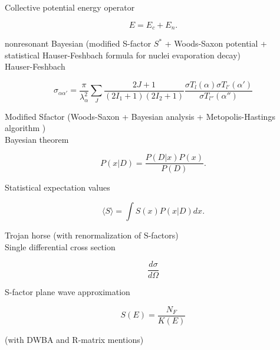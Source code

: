\documentclass[openany]{book}
\begin{document}
Collective potential energy operator

\begin{equation}\label{eq:middleFusion_collectivePotential}
	E = E_c + E_n.
\end{equation}


nonresonant Bayesian (modified S-factor $S^{*}$ + Woods-Saxon potential + statistical Hauser-Feshbach formula for nuclei evaporation decay)\cite{li_fang_bucher_li_ru_tang_2020} \\

Hauser-Feshbach 

\begin{equation}\label{eq:middleFusion_hauserFeschbach}
	\sigma_{\alpha \alpha'} = \frac{\pi}{\lambda^2_\alpha} \sum_{J} \frac{2J+1}{(2I_1 + 1)(2I_2 + 1)} \frac {\sigma T_{l}(\alpha)\sigma T_{l'}(\alpha ')}{\sigma T_{l''}(\alpha '')} 
\end{equation}

Modified Sfactor (Woods-Saxon + Bayesian analysis + Metopolis-Hastings algorithm ) \cite{luo_wen_lin_yang_jia_yang_huang_chang_zhang_yang_et_2022} \\

Bayesian theorem

 \begin{equation}\label{eq:middleFusion_bayesian_theorem}
	P(x | D) = \frac{P( D | x) P(x)}{P(D)}.
\end{equation}

Statistical expectation values

 \begin{equation}\label{eq:middleFusion_bayesian_expectation}
	\langle S \rangle = \int S(x) P(x | D) dx.
\end{equation}

Trojan horse (with renormalization of S-factors) \cite{mukhamedzhanov_pang_kadyrov_2019} \\

Single differential cross section

 \begin{equation}\label{eq:middleFusion_THM_singleDifferential}
	\frac{d\sigma}{d\Omega}
\end{equation}

S-factor plane wave approximation

 \begin{equation}\label{eq:middleFusion_THM_sfactorFormula_planeWave}
	S(E) = \frac{N_F}{K(E)} 
\end{equation}

 (with DWBA and R-matrix mentions) \cite{mukhamedzanov_2022} \\
 
\end{document}
